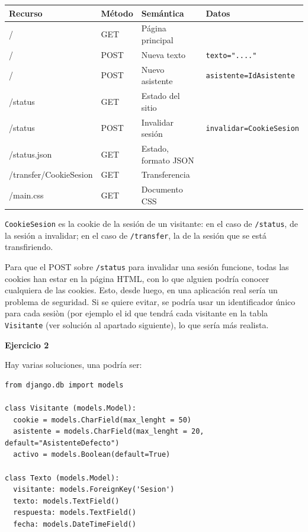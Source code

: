 \begin{tabular}{|l|l|l|l|}
  \hline
  Recurso & Método & Semántica & Datos \\ \hline\hline
  /       & GET    & Página principal & \\
  /       & POST   & Nueva texto & \texttt{texto="...."} \\
  /       & POST   & Nuevo asistente & \texttt{asistente=IdAsistente} \\
  /status & GET & Estado del sitio & \\
  /status & POST & Invalidar sesión & \texttt{invalidar=CookieSesion}\\
  /status.json & GET & Estado, formato JSON & \\
  /transfer/CookieSesion & GET & Transferencia & \\
  /main.css & GET & Documento CSS &  \\
  \hline
\end{tabular}

\texttt{CookieSesion} es la cookie de la sesión de un visitante: en el caso de \texttt{/status}, de la sesión a invalidar; en el caso de \texttt{/transfer}, la de la sesión que se está transfiriendo.

Para que el POST sobre \texttt{/status} para invalidar una sesión funcione, todas las cookies han estar en la página HTML, con lo que alguien podría conocer cualquiera de las cookies. Esto, desde luego, en una aplicación real sería un problema de seguridad. Si se quiere evitar, se podría usar un identificador único para cada sesiòn (por ejemplo el id que tendrá cada visitante en la tabla \texttt{Visitante} (ver solución al apartado siguiente), lo que sería más realista.


\textbf{Ejercicio 2}

Hay varias soluciones, una podría ser:

\begin{verbatim}
from django.db import models

class Visitante (models.Model):
  cookie = models.CharField(max_lenght = 50)
  asistente = models.CharField(max_lenght = 20, default="AsistenteDefecto")
  activo = models.Boolean(default=True)

class Texto (models.Model):
  visitante: models.ForeignKey('Sesion')
  texto: models.TextField()
  respuesta: models.TextField()
  fecha: models.DateTimeField()

\end{verbatim}

